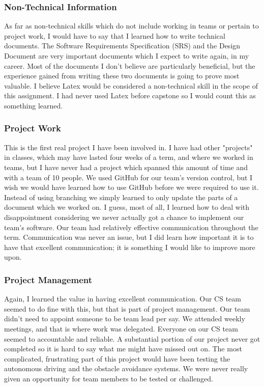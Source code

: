 \documentclass[10pt,letterpaper,onecolumn,draftclsnofoot,journal]{IEEEtran}
\begin{document}
\subsubsection{\textbf{Non-Technical Information}}
As far as non-technical skills which do not include working in teams or pertain to project work, I would have to say that I learned how to write technical documents. The Software Requirements Specification (SRS) and the Design Document are very important documents which I expect to write again, in my career. Most of the documents I don't believe are particularly beneficial, but the experience gained from writing these two documents is going to prove most valuable. I believe Latex would be considered a non-technical skill in the scope of this assignment. I had never used Latex before capstone so I would count this as something learned. 
\subsubsection{\textbf{Project Work}}
This is the first real project I have been involved in. I have had other "projects" in classes, which may have lasted four weeks of a term, and where we worked in teams, but I have never had a project which spanned this amount of time and with a team of 10 people. We used GitHub for our team's version control, but I wish we would have learned how to use GitHub before we were required to use it. Instead of using branching we simply learned to only update the parts of a document which we worked on. I guess, most of all, I learned how to deal with disappointment considering we never actually got a chance to implement our team's software. Our team had relatively effective communication throughout the term. Communication was never an issue, but I did learn how important it is to have that excellent communication; it is something I would like to improve more upon.
\subsubsection{\textbf{Project Management}}
Again, I learned the value in having excellent communication. Our CS team seemed to do fine with this, but that is part of project management. Our team didn't need to appoint someone to be team lead per say. We attended weekly meetings, and that is where work was delegated. Everyone on our CS team seemed to accountable and reliable. A substantial portion of our project never got completed so it is hard to say what me might have missed out on. The most complicated, frustrating part of this project would have been testing the autonomous driving and the obstacle avoidance systems. We were never really given an opportunity for team members to be tested or challenged.
\end{document}
